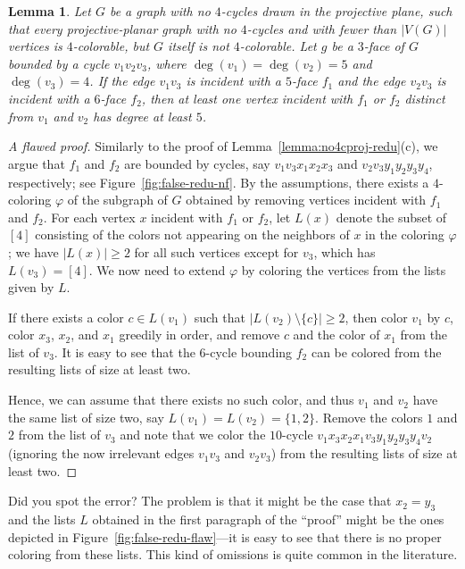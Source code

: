 \documentclass[12pt,twoside,openright,a4paper]{book}
\newtheorem{lemma}[theorem]{Lemma}
\begin{document}
\begin{lemma}\label{lemma:false-redu}
Let $G$ be a graph with no $4$-cycles drawn in the projective plane, such that every projective-planar graph
with no $4$-cycles and with fewer than $|V(G)|$ vertices is $4$-colorable, but $G$ itself is not $4$-colorable.
Let $g$ be a $3$-face of $G$ bounded by a cycle $v_1v_2v_3$, where $\deg(v_1)=\deg(v_2)=5$ and $\deg(v_3)=4$.
If the edge $v_1v_3$ is incident with a $5$-face $f_1$ and the edge $v_2v_3$ is incident with a $6$-face $f_2$,
then at least one vertex incident with $f_1$ or $f_2$ distinct from $v_1$ and $v_2$ has degree at least $5$.
\end{lemma}
\begin{proof}[A flawed proof]
Similarly to the proof of Lemma~\ref{lemma:no4cproj-redu}(c), we argue that $f_1$ and $f_2$ are bounded by cycles,
say $v_1v_3x_1x_2x_3$ and $v_2v_3y_1y_2y_3y_4$, respectively; see Figure~\ref{fig:false-redu-nf}.  By the assumptions, there exists a $4$-coloring $\varphi$
of the subgraph of $G$ obtained by removing vertices incident with $f_1$ and $f_2$.
For each vertex $x$ incident with $f_1$ or $f_2$, let $L(x)$ denote the subset of $[4]$ consisting of the colors not
appearing on the neighbors of $x$ in the coloring $\varphi$; we have $|L(x)|\ge 2$ for all such vertices except for $v_3$,
which has $L(v_3)=[4]$.  We now need to extend $\varphi$ by coloring the vertices from the lists given by $L$.

If there exists a color $c\in L(v_1)$ such that $|L(v_2)\setminus \{c\}|\ge 2$, then color $v_1$ by $c$, color
$x_3$, $x_2$, and $x_1$ greedily in order, and remove $c$ and the color of $x_1$ from the list of $v_3$.  It is
easy to see that the $6$-cycle bounding $f_2$ can be colored from the resulting lists of size at least two.

Hence, we can assume that there exists no such color, and thus $v_1$ and $v_2$ have the same list of size two, say $L(v_1)=L(v_2)=\{1,2\}$.
Remove the colors $1$ and $2$ from the list of $v_3$ and note that we color the $10$-cycle $v_1x_3x_2x_1v_3y_1y_2y_3y_4v_2$ (ignoring the now
irrelevant edges $v_1v_3$ and $v_2v_3$) from the resulting lists of size at least two.
\end{proof}
Did you spot the error?  The problem is that it might be the case that $x_2=y_3$ and the lists $L$ obtained in the first paragraph
of the ``proof'' might be the ones depicted in Figure~\ref{fig:false-redu-flaw}---it is easy to see that there is no proper coloring
from these lists.  This kind of omissions is quite common in the literature.
\end{document}
